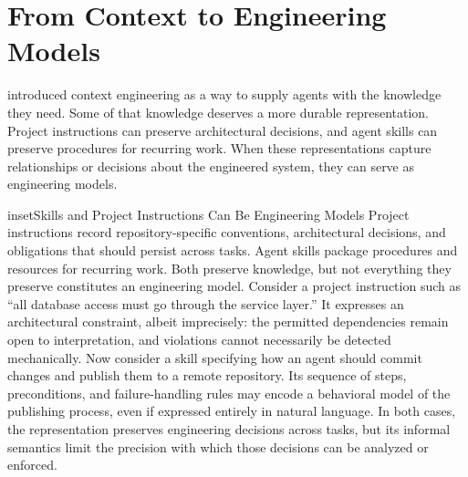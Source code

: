 


\chapter{From Context to Engineering Models}



 introduced context engineering as a way to supply agents with the knowledge they need. Some of that knowledge deserves a more durable representation. Project instructions can preserve architectural decisions, and agent skills can preserve procedures for recurring work. When these representations capture relationships or decisions about the engineered system, they can serve as engineering models.





\begin{bookbox}{inset}{Skills and Project Instructions Can Be Engineering Models}
\label{inset-skills-and-project-instructions}
Project instructions record repository-specific conventions, architectural decisions, and obligations that should persist across tasks. Agent skills package procedures and resources for recurring work. Both preserve knowledge, but not everything they preserve constitutes an engineering model. Consider a project instruction such as ``all database access must go through the service layer.'' It expresses an architectural constraint, albeit imprecisely: the permitted dependencies remain open to interpretation, and violations cannot necessarily be detected mechanically. Now consider a skill specifying how an agent should commit changes and publish them to a remote repository. Its sequence of steps, preconditions, and failure-handling rules may encode a behavioral model of the publishing process, even if expressed entirely in natural language. In both cases, the representation preserves engineering decisions across tasks, but its informal semantics limit the precision with which those decisions can be analyzed or enforced.
\end{bookbox}

